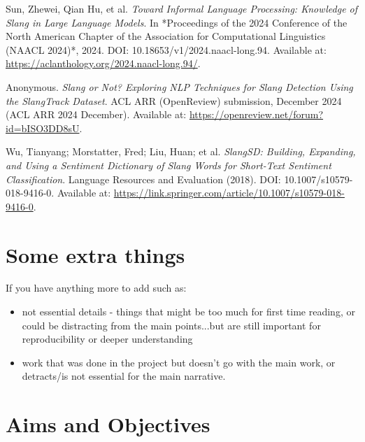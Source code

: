 \documentclass[12pt]{article}
\begin{document}
\begin{thebibliography}{9}
Sun, Zhewei, Qian Hu, et al.  
\textit{Toward Informal Language Processing: Knowledge of Slang in Large Language Models}.  
In *Proceedings of the 2024 Conference of the North American Chapter of the Association for Computational Linguistics (NAACL 2024)*, 2024.  
DOI: 10.18653/v1/2024.naacl-long.94.  
Available at: \url{https://aclanthology.org/2024.naacl-long.94/}.

Anonymous.  
\textit{Slang or Not? Exploring NLP Techniques for Slang Detection Using the SlangTrack Dataset}.  
ACL ARR (OpenReview) submission, December 2024 (ACL ARR 2024 December).  
Available at: \url{https://openreview.net/forum?id=bISO3DD8sU}.

Wu, Tianyang; Morstatter, Fred; Liu, Huan; et al.  
\textit{SlangSD: Building, Expanding, and Using a Sentiment Dictionary of Slang Words for Short-Text Sentiment Classification}.  
Language Resources and Evaluation (2018).  
DOI: 10.1007/s10579-018-9416-0.  
Available at: \url{https://link.springer.com/article/10.1007/s10579-018-9416-0}.



\end{thebibliography}


\appendix

\renewcommand{\thesection}{Appendix \Alph{section}}

\section{Some extra things}

If you have anything more to add such as:
\begin{itemize}
\item not essential details - things that might be too much for first time reading, or could be distracting from the main points...but are still important for reproducibility or deeper understanding
\item work that was done in the project but doesn't go with the main work, or detracts/is not essential for the main narrative.  
\end{itemize}

\section{Aims and Objectives}
\end{document}
